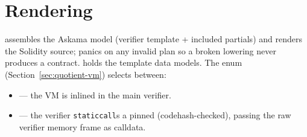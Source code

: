 \section{Rendering}
\label{sec:render}

 assembles the
Askama model (verifier template + included partials) and renders the
Solidity source;  panics on any invalid plan so a
broken lowering never produces a contract.  holds the
template data models. The  enum
(Section~\ref{sec:quotient-vm}) selects between:
\begin{itemize}[leftmargin=1.4em,itemsep=1pt]
  \item {} --- the VM is inlined in the main verifier.
  \item {} --- the verifier \texttt{staticcall}s a pinned
         (codehash-checked), passing the raw
        verifier memory frame as calldata.
\end{itemize}
